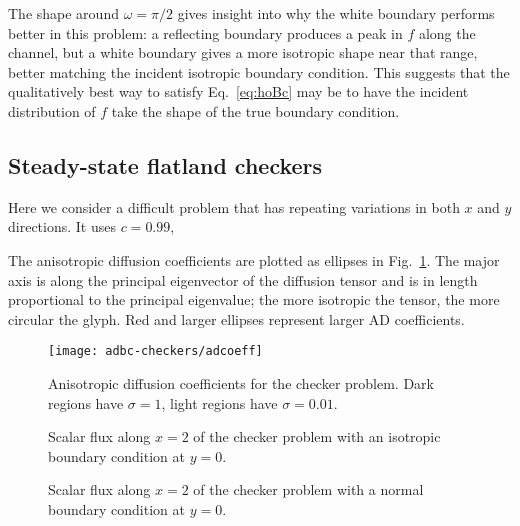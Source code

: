 The shape around $\omega=\pi/2$ gives insight into why the white boundary
performs better in this problem: a reflecting boundary produces a peak in $f$
along the channel, but a white boundary gives a more isotropic shape near that
range, better matching the incident isotropic boundary condition. This suggests
that the qualitatively best way to satisfy Eq.~\eqref{eq:hoBc} may be
to have the incident distribution of $f$ take the shape of the true boundary
condition.

\clearpage
\subsection{Steady-state flatland checkers}

Here we consider a difficult problem that has repeating variations in both $x$
and $y$ directions. It uses $c=0.99$, 

The anisotropic diffusion coefficients are plotted as ellipses in
Fig.~\ref{fig:bcCheckersAdcoeff}. The major axis is along the principal
eigenvector of the diffusion tensor and is in length proportional to the
principal eigenvalue; the more isotropic the tensor, the more circular the
glyph. Red and larger ellipses represent larger AD coefficients.

\begin{figure}[htb]
  \centering\small
  \texttt{[image: adbc-checkers/adcoeff]}
  \caption[Anisotropic diffusion coefficients for the checker problem.]{
  Anisotropic diffusion coefficients for the checker problem. Dark
  regions have $\sigma=1$, light regions have $\sigma=0.01$.}
  \label{fig:bcCheckersAdcoeff}
\end{figure}

\begin{figure}[htb]
  \centering\small
  \hspace{-.5in}
  
  \hspace{-.5in}
  \caption{Scalar flux along $x=2$ of the checker problem with an isotropic
  boundary condition at $y=0$.}
  \label{fig:bcCheckersIsotropic}
\end{figure}

\begin{figure}[htb]
  \centering\small
  \hspace{-.5in}
  
  \hspace{-.5in}
  \caption{Scalar flux along $x=2$ of the checker problem with a normal
  boundary condition at $y=0$.}
  \label{fig:bcCheckersDelta}
\end{figure}


